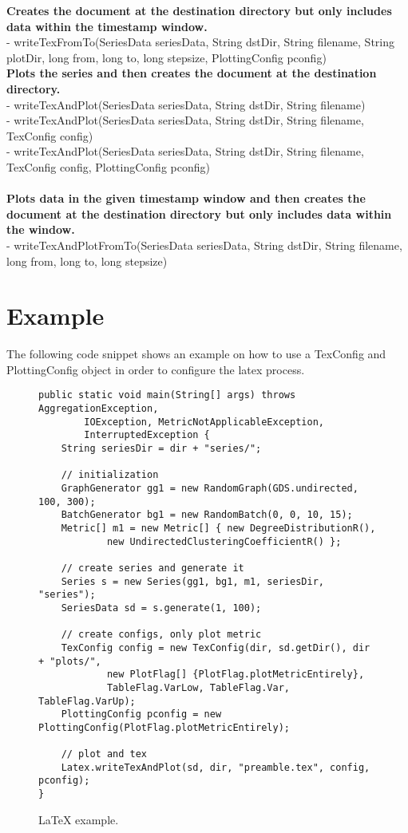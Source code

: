 \textbf{Creates the document at the destination directory but only includes data within the timestamp window.}\\
- writeTexFromTo(SeriesData seriesData, String dstDir, String filename, String plotDir, long from, long to, long stepsize, PlottingConfig pconfig)\\

\textbf{Plots the series and then creates the document at the destination directory.}\\
- writeTexAndPlot(SeriesData seriesData, String dstDir, String filename)\\
- writeTexAndPlot(SeriesData seriesData, String dstDir, String filename, TexConfig config)\\
- writeTexAndPlot(SeriesData seriesData, String dstDir, String filename, TexConfig config, PlottingConfig pconfig)\\
\\

\textbf{Plots data in the given timestamp window and then creates the document at the destination directory but only includes data within the window.}\\
- writeTexAndPlotFromTo(SeriesData seriesData, String dstDir, String filename, long from, long to, long stepsize)\\

\section{Example}
The following code snippet shows an example on how to use a TexConfig and PlottingConfig object in order to configure the latex process.

\begin{figure} [bh]
\begin{lstlisting}
public static void main(String[] args) throws AggregationException,
		IOException, MetricNotApplicableException,
		InterruptedException {
	String seriesDir = dir + "series/";

	// initialization
	GraphGenerator gg1 = new RandomGraph(GDS.undirected, 100, 300);
	BatchGenerator bg1 = new RandomBatch(0, 0, 10, 15);
	Metric[] m1 = new Metric[] { new DegreeDistributionR(),
			new UndirectedClusteringCoefficientR() };

	// create series and generate it
	Series s = new Series(gg1, bg1, m1, seriesDir, "series");
	SeriesData sd = s.generate(1, 100);

	// create configs, only plot metric
	TexConfig config = new TexConfig(dir, sd.getDir(), dir + "plots/",
			new PlotFlag[] {PlotFlag.plotMetricEntirely},
			TableFlag.VarLow, TableFlag.Var, TableFlag.VarUp);
	PlottingConfig pconfig = new PlottingConfig(PlotFlag.plotMetricEntirely);

	// plot and tex
	Latex.writeTexAndPlot(sd, dir, "preamble.tex", config, pconfig);
}
\end{lstlisting}
\caption{LaTeX example.}
\label{code:example}
\end{figure}